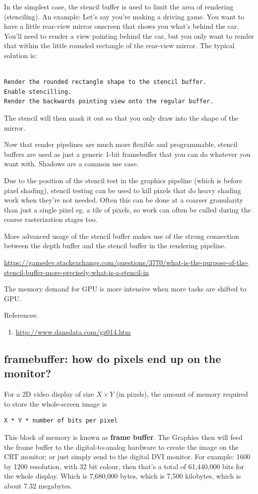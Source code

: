 \begin{enumerate}
In the simplest case, the stencil buffer is used to limit the area of rendering
(stenciling).
An example: Let's say you're making a driving game. You want to have a little
rear-view mirror onscreen that shows you what's behind the car. You'll need to
render a view pointing behind the car, but you only want to render that within
the little rounded rectangle of the rear-view mirror. The typical solution is:
\begin{verbatim}

Render the rounded rectangle shape to the stencil buffer.
Enable stencilling.
Render the backwards pointing view onto the regular buffer.
\end{verbatim}
The stencil will then mask it out so that you only draw into the shape of the mirror.

Now that render pipelines are much more flexible and programmable, stencil
buffers are used as just a generic 1-bit framebuffer that you can do whatever
you want with. Shadows are a common use case.

Due to the position of the stencil test in the graphics pipeline (which is
before pixel shading), stencil testing can be used to kill pixels that do heavy
shading work when they're not needed.
Often this can be done at a coarser granularity than just a single pixel eg. a
tile of pixels, so work can often be culled during the coarse rasterization
stages too.

More advanced usage of the stencil buffer makes use of the strong connection
between the depth buffer and the stencil buffer in the rendering pipeline.

\url{https://gamedev.stackexchange.com/questions/3770/what-is-the-purpose-of-the-stencil-buffer-more-precisely-what-is-a-stencil-in}
\end{enumerate}

The memory demand for GPU is more intensive when more tasks are shifted to
GPU. 


References:
\begin{enumerate}
\item \url{http://www.dansdata.com/gz014.htm}
\end{enumerate}


\subsection{framebuffer: how do pixels end up on the monitor?}
\label{sec:framebuffer}

For a 2D video display of size $X\times Y$ (in pixels), the amount of
memory required to store the whole-screen image is
\begin{lstlisting}
X * Y * number of bits per pixel
\end{lstlisting}
This block of memory is known as {\bf frame buffer}. The Graphics then
will feed the frame buffer to the digital-to-analog hardware to create
the image on the CRT monitor; or just simply send to the digital DVI
monitor. For example: 1600 by 1200 resolution, with 32 bit colour,
then that's a total of 61,440,000 bits for the whole display. Which is
7,680,000 bytes, which is 7,500 kilobytes, which is about 7.32
megabytes.


